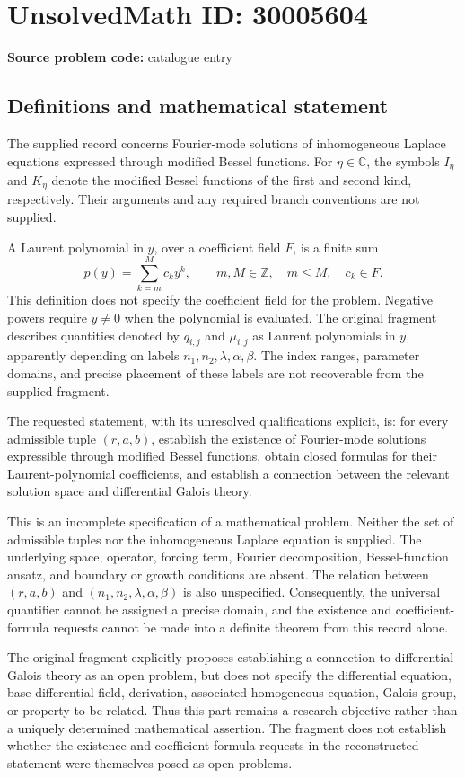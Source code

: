 \documentclass[11pt]{article}
\newcommand{\Z}{\mathbb{Z}}
\newcommand{\C}{\mathbb{C}}
\begin{document}
\section*{UnsolvedMath ID: 30005604}
\textbf{Source problem code:} catalogue entry
\subsection{Definitions and mathematical statement}
The supplied record concerns Fourier-mode solutions of inhomogeneous Laplace equations expressed through modified Bessel functions. For \(\eta\in\C\), the symbols \(I_\eta\) and \(K_\eta\) denote the modified Bessel functions of the first and second kind, respectively. Their arguments and any required branch conventions are not supplied.

A Laurent polynomial in \(y\), over a coefficient field \(F\), is a finite sum
\[
p(y)=\sum_{k=m}^{M}c_k y^k,\qquad m,M\in\Z,\quad m\le M,\quad c_k\in F.
\]
This definition does not specify the coefficient field for the problem. Negative powers require \(y\ne0\) when the polynomial is evaluated. The original fragment describes quantities denoted by \(q_{i,j}\) and \(\mu_{i,j}\) as Laurent polynomials in \(y\), apparently depending on labels \(n_1,n_2,\lambda,\alpha,\beta\). The index ranges, parameter domains, and precise placement of these labels are not recoverable from the supplied fragment.

The requested statement, with its unresolved qualifications explicit, is: for every admissible tuple \((r,a,b)\), establish the existence of Fourier-mode solutions expressible through modified Bessel functions, obtain closed formulas for their Laurent-polynomial coefficients, and establish a connection between the relevant solution space and differential Galois theory.

This is an incomplete specification of a mathematical problem. Neither the set of admissible tuples nor the inhomogeneous Laplace equation is supplied. The underlying space, operator, forcing term, Fourier decomposition, Bessel-function ansatz, and boundary or growth conditions are absent. The relation between \((r,a,b)\) and \((n_1,n_2,\lambda,\alpha,\beta)\) is also unspecified. Consequently, the universal quantifier cannot be assigned a precise domain, and the existence and coefficient-formula requests cannot be made into a definite theorem from this record alone.

The original fragment explicitly proposes establishing a connection to differential Galois theory as an open problem, but does not specify the differential equation, base differential field, derivation, associated homogeneous equation, Galois group, or property to be related. Thus this part remains a research objective rather than a uniquely determined mathematical assertion. The fragment does not establish whether the existence and coefficient-formula requests in the reconstructed statement were themselves posed as open problems.
\end{document}
